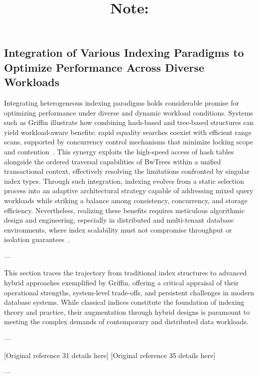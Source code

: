 \documentclass[11pt]{article}
\begin{document}
\subsection{Integration of Various Indexing Paradigms to Optimize Performance Across Diverse Workloads}

Integrating heterogeneous indexing paradigms holds considerable promise for optimizing performance under diverse and dynamic workload conditions. Systems such as Griffin illustrate how combining hash-based and tree-based structures can yield workload-aware benefits: rapid equality searches coexist with efficient range scans, supported by concurrency control mechanisms that minimize locking scope and contention~\cite{ref35}. This synergy exploits the high-speed access of hash tables alongside the ordered traversal capabilities of BwTrees within a unified transactional context, effectively resolving the limitations confronted by singular index types. Through such integration, indexing evolves from a static selection process into an adaptive architectural strategy capable of addressing mixed query workloads while striking a balance among consistency, concurrency, and storage efficiency. Nevertheless, realizing these benefits requires meticulous algorithmic design and engineering, especially in distributed and multi-tenant database environments, where index scalability must not compromise throughput or isolation guarantees~\cite{ref31,ref35}.

---

This section traces the trajectory from traditional index structures to advanced hybrid approaches exemplified by Griffin, offering a critical appraisal of their operational strengths, system-level trade-offs, and persistent challenges in modern database systems. While classical indices constitute the foundation of indexing theory and practice, their augmentation through hybrid designs is paramount to meeting the complex demands of contemporary and distributed data workloads.

---

\begin{thebibliography}{99}
 [Original reference 31 details here]
 [Original reference 35 details here]
\end{thebibliography}

---

\title{Note:}
\maketitle
\end{document}
